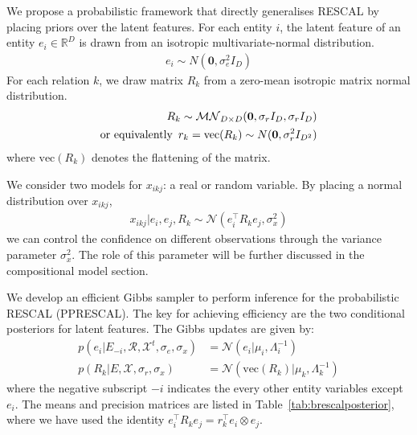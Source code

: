 We propose a probabilistic framework that directly generalises RESCAL
by placing priors over the
latent features. For each entity $i$, the latent feature of an entity $e_i \in
\mathbb{R}^{D}$ is drawn from an isotropic multivariate-normal distribution.
\begin{align}
\label{eqn:entity_gen}
e_i \sim {N}(\mathbf{0}, \sigma_e^2{I}_D)
\end{align}
For each relation $k$, we draw matrix $R_k$ from
a zero-mean isotropic matrix normal distribution.
\begin{align}
\label{eqn:relation_gen}
R_k \sim \mathcal{MN}_{D \times D}(\mathbf{0}, \sigma_r{I}_D, \sigma_r{I}_D) \\
\text{or equivalently}\enspace r_k  = \text{vec}(R_k) \sim N(\mathbf{0}, \sigma_r^2 I_{D^2}) \notag
\end{align}
where $\text{vec}(R_k)$ denotes the flattening of the matrix.

We consider two models for $x_{ikj}$: a real or random variable. By placing a
normal distribution over $x_{ikj}$,
\begin{align}
  x_{ikj} |e_i, e_j, R_k \sim \mathcal{N}(e_i^{\top} R_k e_j, \sigma_x^2) \label{eqn:triple_gen}
\end{align}
we can control the confidence on different observations
through the variance parameter $\sigma_x^2$.
The role of this parameter will be further discussed in the compositional model section.

We develop an efficient Gibbs sampler to perform inference for the probabilistic RESCAL (PPRESCAL).
The key for achieving efficiency are the two conditional posteriors for latent features.
The Gibbs updates are given by:
\begin{align}
p(e_i |E_{-i}, \mathcal{R}, \mathcal{X}^{t}, \sigma_e, \sigma_x) &= \mathcal{N}(e_i | \mu_i,
\Lambda_i^{-1})  \label{eqn:sample_e} \\
p(R_k|E, \mathcal{X}, \sigma_r, \sigma_x) &= \mathcal{N}(\text{vec}(R_k) |
\mu_k, \Lambda_k^{-1}) \label{eqn:sample_r}
\end{align}
where the negative subscript $-i$ indicates the every other entity variables except $e_i$.
The means and precision matrices are listed in Table~\ref{tab:brescalposterior}, where we have
used the identity $e_i^{\top} R_k e_j = r_k^{\top} e_i \otimes e_j$.

